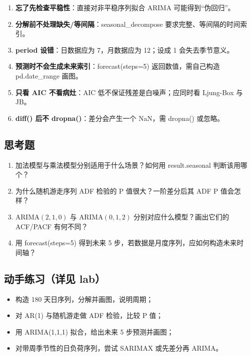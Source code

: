 \begin{enumerate}
\def\labelenumi{\arabic{enumi}.}
\tightlist
\item
  \textbf{忘了先检查平稳性}：直接对非平稳序列拟合 ARIMA
  可能得到``伪回归''。
\item
  \textbf{分解前不处理缺失/等间隔}：seasonal\_decompose
  要求完整、等间隔的时间索引。
\item
  \textbf{period 设错}：日数据应为 7，月数据应为 12；设成 1
  会失去季节意义。
\item
  \textbf{预测时不会生成未来索引}：forecast(steps=5)
  返回数值，需自己构造 pd.date\_range 画图。
\item
  \textbf{只看 AIC 不看病灶}：AIC 低不保证残差是白噪声；应同时看
  Ljung-Box 与 JB。
\item
  \textbf{diff() 后不 dropna()}：差分会产生一个 NaN，需 dropna()
  或忽略。
\end{enumerate}

\subsection{思考题}\label{ux601dux8003ux9898-23}

\begin{enumerate}
\def\labelenumi{\arabic{enumi}.}
\tightlist
\item
  加法模型与乘法模型分别适用于什么场景？如何用 result.seasonal
  判断该用哪个？
\item
  为什么随机游走序列 ADF 检验的 P 值很大？一阶差分后其 ADF P 值会怎样？
\item
  ARIMA\((2,1,0)\) 与 ARIMA\((0,1,2)\) 分别对应什么模型？画出它们的
  ACF/PACF 有何不同？
\item
  用 forecast(steps=5) 得到未来 5
  步，若数据是月度序列，应如何构造未来时间轴？
\end{enumerate}

\subsection{动手练习（详见
lab）}\label{ux52a8ux624bux7ec3ux4e60ux8be6ux89c1-lab-15}

\begin{itemize}
\tightlist
\item
  构造 180 天日序列，分解并画图，说明周期；
\item
  对 AR(1) 与随机游走做 ADF 检验，比较 P 值；
\item
  用 ARIMA(1,1,1) 拟合，给出未来 5 步预测并画图；
\item
  对带周季节性的日负荷序列，尝试 SARIMAX 或先差分再 ARIMA。
\end{itemize}

